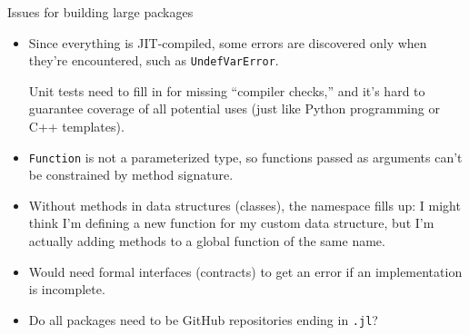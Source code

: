 \documentclass{beamer}
\begin{document}
\begin{frame}{Issues for building large packages}
\vspace{0.4 cm}
\begin{itemize}
  \item Since everything is JIT-compiled, some errors are discovered only when they're encountered, such as {\tt \small UndefVarError}.

\vspace{0.2 cm}
Unit tests need to fill in for missing ``compiler checks,'' and it's hard to guarantee coverage of all potential uses (just like Python programming or C++ templates).

  \item {\tt \small Function} is not a parameterized type, so functions passed as arguments can't be constrained by method signature.

  \item Without methods in data structures (classes), the namespace fills up: I might think I'm defining a new function for my custom data structure, but I'm actually adding methods to a global function of the same name.

  \item Would need formal interfaces (contracts) to get an error if an implementation is incomplete.

  \item Do all packages need to be GitHub repositories ending in {\tt \small .jl}?
\end{itemize}
\end{frame}
\end{document}
